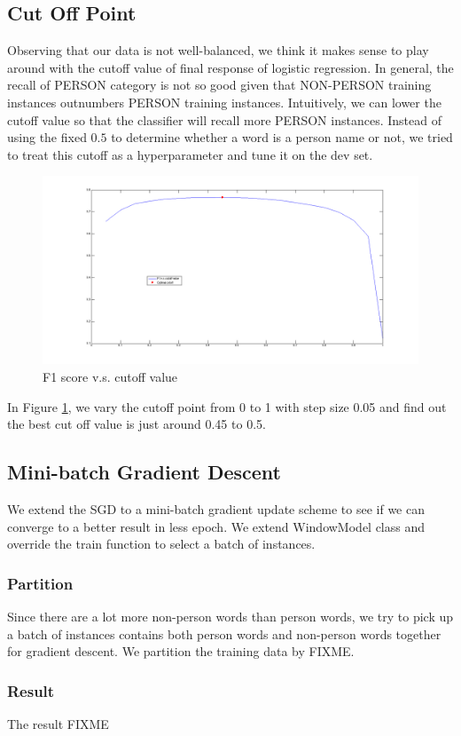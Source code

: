 \documentclass[letterpaper]{article}
\begin{document}
\subsection{Cut Off Point}
Observing that our data is not well-balanced, we think it makes sense to play around with the cutoff value of final response of logistic regression. In general, the recall of PERSON category is not so good given that NON-PERSON training instances outnumbers PERSON training instances.
Intuitively, we can lower the cutoff value so that the classifier will recall more PERSON instances.
Instead of using the fixed $0.5$ to determine whether a word is a person name or not, we tried to treat this cutoff as a hyperparameter and tune it on the dev set.
\begin{figure}[ht]
\begin{center}
\includegraphics[scale=0.2]{f1.png}
\caption{F1 score v.s. cutoff value}
\label{fig:cutoff}
\end{center}
\end{figure}
In Figure \ref{fig:cutoff}, we vary the cutoff point from 0 to 1 with step size 0.05 and find out the best cut off value is just around 0.45 to 0.5.


\subsection{Mini-batch Gradient Descent}
We extend the SGD to a mini-batch gradient update scheme to see if we can converge to a better result in less epoch. We extend WindowModel class and override the train function to select a batch of instances.
\subsubsection{Partition}
Since there are a lot more non-person words than person words, we try to pick up a batch of instances contains both person words and non-person words together for gradient descent. We partition the training data by FIXME.
\subsubsection{Result}
The result FIXME
\end{document}
